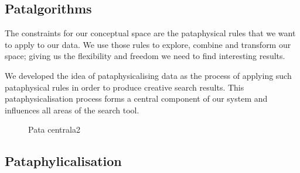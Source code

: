 
\subsection*{Patalgorithms}

\begin{draft}
  The constraints for our conceptual space are the pataphysical rules that we want to apply to our data. We use those rules to explore, combine and transform our space; giving us the flexibility and freedom we need to find interesting results.

  We developed the idea of pataphysicalising data as the process of applying such pataphysical rules in order to produce creative search results. This pataphysicalisation process forms a central component of our system and influences all areas of the search tool.
\end{draft}



\begin{figure}[htb] %
  \centering
  
\caption[Pata centrala2]{Pata centrala2}
\label{fig:patasearch02}
\end{figure}


\subsection*{Pataphylicalisation}


